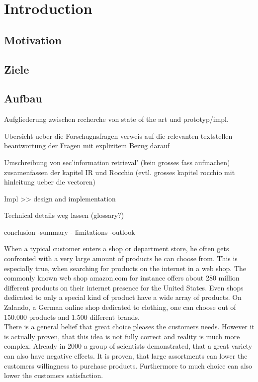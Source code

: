 
\section{Introduction}


\subsection{Motivation}
\subsection{Ziele}
\subsection{Aufbau}

{\color{red}
    Aufgliederung zwischen recherche von state of the art
    und prototyp/impl.



    Ubersicht ueber die Forschugnsfragen
    verweis auf die relevanten textstellen
    beantwortung der Fragen mit explizitem Bezug darauf

    Umschreibung von sec'information retrieval' (kein grosses fass aufmachen)
    zusamenfassen der kapitel IR und Rocchio (evtl. grosses kapitel rocchio mit hinleitung ueber die vectoren)


    Impl >> design and implementation

    Technical details weg lassen (glossary?)


    conclusion
        -summary
            - limitations
        -outlook
}



When a typical customer enters a shop or department store, he often gets confronted with a very large amount of products he can choose from.
This is especially true, when searching for products on the internet in a web shop.
The commonly known web shop amazon.com for instance offers about 280 million different products on their internet presence for the United States.\citep{marketplaceanalytics:2014}
Even shops dedicated to only a special kind of product have a wide array of products.
On Zalando, a German online shop dedicated to clothing, one can choose out of 150.000 products and 1.500 different brands.\citep{visser:2014}\\
There is a general belief that great choice pleases the customers needs.
However it is actually proven, that this idea is not fully correct and reality is much more complex.
Already in 2000 a group of scientists demonstrated, that a great variety can also have negative effects.\citep[312]{diehl:2010}
It is proven, that large assortments can lower the customers willingness to purchase products.\citep[313]{diehl:2010}
Furthermore to much choice can also lower the customers satisfaction.\citep[320]{diehl:2010}


